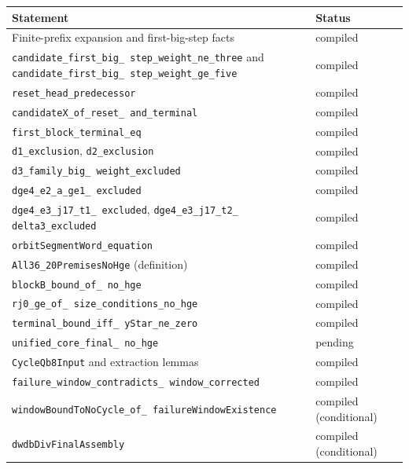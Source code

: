\begin{center}
\small
\begin{tabular}{@{}p{}p{}@{}}
\toprule
Statement & Status \\
\midrule
Finite-prefix expansion and first-big-step facts & compiled \\
 \texttt{candidate\_\allowbreak first\_\allowbreak big\_\allowbreak
 step\_\allowbreak weight\_\allowbreak ne\_three} and
 \texttt{candidate\_\allowbreak first\_\allowbreak big\_\allowbreak
 step\_\allowbreak weight\_\allowbreak ge\_five} & compiled \\
\texttt{reset\_\allowbreak head\_\allowbreak predecessor} & compiled \\
\texttt{candidateX\_\allowbreak of\_\allowbreak reset\_\allowbreak
 and\_\allowbreak terminal} & compiled \\
\texttt{first\_\allowbreak block\_\allowbreak terminal\_\allowbreak eq}
 & compiled \\
\texttt{d1\_\allowbreak exclusion}, \texttt{d2\_\allowbreak exclusion}
 & compiled \\
\texttt{d3\_\allowbreak family\_\allowbreak big\_\allowbreak
 weight\_\allowbreak excluded} & compiled \\
\texttt{dge4\_\allowbreak e2\_\allowbreak a\_\allowbreak ge1\_\allowbreak
 excluded} & compiled \\
\texttt{dge4\_\allowbreak e3\_\allowbreak j17\_\allowbreak t1\_\allowbreak
 excluded},
\texttt{dge4\_\allowbreak e3\_\allowbreak j17\_\allowbreak t2\_\allowbreak
 delta3\_\allowbreak excluded} & compiled \\
\texttt{orbitSegmentWord\_\allowbreak equation} & compiled \\
\texttt{All36\_\allowbreak 20PremisesNoHge} (definition) & compiled \\
\texttt{blockB\_\allowbreak bound\_\allowbreak of\_\allowbreak
 no\_\allowbreak hge} & compiled \\
\texttt{rj0\_\allowbreak ge\_\allowbreak of\_\allowbreak
 size\_\allowbreak conditions\_\allowbreak no\_\allowbreak hge} & compiled \\
\texttt{terminal\_\allowbreak bound\_\allowbreak iff\_\allowbreak
 yStar\_\allowbreak ne\_\allowbreak zero} & compiled \\
\texttt{unified\_\allowbreak core\_\allowbreak final\_\allowbreak
 no\_\allowbreak hge} & pending \\
\texttt{CycleQb8Input} and extraction lemmas & compiled \\
\texttt{failure\_\allowbreak window\_\allowbreak contradicts\_\allowbreak
 window\_\allowbreak corrected} & compiled \\
\texttt{windowBoundToNoCycle\_\allowbreak of\_\allowbreak
 failureWindowExistence} &
compiled (conditional) \\
\texttt{dwdbDivFinalAssembly} & compiled (conditional) \\
\bottomrule
\end{tabular}
\end{center}

